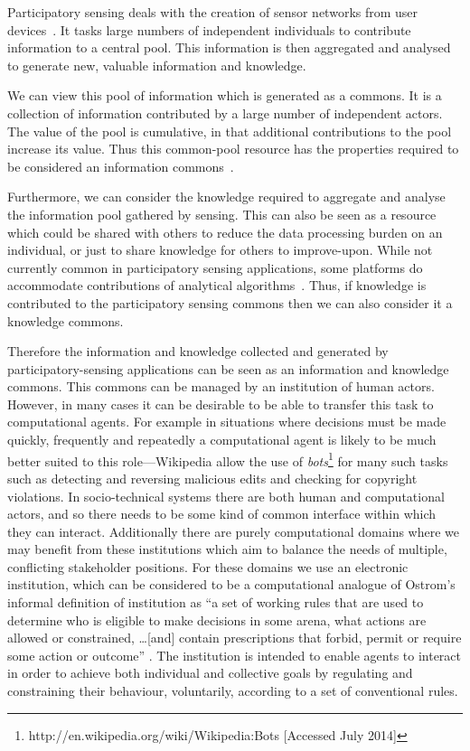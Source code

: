 Participatory sensing deals with the creation of sensor networks from user devices~\citep{Burke2006}. 
It tasks large numbers of independent individuals to contribute information to a central pool. 
This information is then aggregated and analysed to generate new, valuable information and knowledge.

We can view this pool of information which is generated as a commons. 
It is a collection of information contributed by a large number of independent actors. 
The value of the pool is cumulative, in that additional contributions to the pool increase its value.
Thus this common-pool resource has the properties required to be considered an information commons~\citep{Bollier2007}.

Furthermore, we can consider the knowledge required to aggregate and analyse the information pool gathered by sensing. 
This can also be seen as a resource which could be shared with others to reduce the data processing burden on an individual, or just to share knowledge for others to improve-upon. 
While not currently common in participatory sensing applications, some platforms do accommodate contributions of analytical algorithms~\citep{Kansal2007}. 
Thus, if knowledge is contributed to the participatory sensing commons then we can also consider it a knowledge commons.

Therefore the information and knowledge collected and generated by participatory-sensing applications can be seen as an information and knowledge commons. 
This commons can be managed by an institution of human actors.
However, in many cases it can be desirable to be able to transfer this task to computational agents. 
For example in situations where decisions must be made quickly, frequently and repeatedly a computational agent is likely to be much better suited to this role---Wikipedia allow the use of \emph{bots}\footnote{http://en.wikipedia.org/wiki/Wikipedia:Bots [Accessed July 2014]} for many such tasks such as detecting and reversing malicious edits and checking for copyright violations.
In socio-technical systems there are both human and computational actors, and so there needs to be some kind of common interface within which they can interact.
Additionally there are purely computational domains where we may benefit from these institutions which aim to balance the needs of multiple, conflicting stakeholder positions.
For these domains we use an electronic institution, which can be considered to be a computational analogue of Ostrom's
 informal definition of institution as ``a set of working rules that are used to determine who is eligible to make decisions
in some arena, what actions are allowed or constrained, \ldots [and] contain prescriptions that forbid, permit or require
some action or outcome'' \cite[p.\ 51]{Ostrom1990}. The institution is intended to enable agents to interact in order to achieve both individual and collective goals
by regulating and constraining their behaviour, voluntarily, according to a set of conventional rules.

